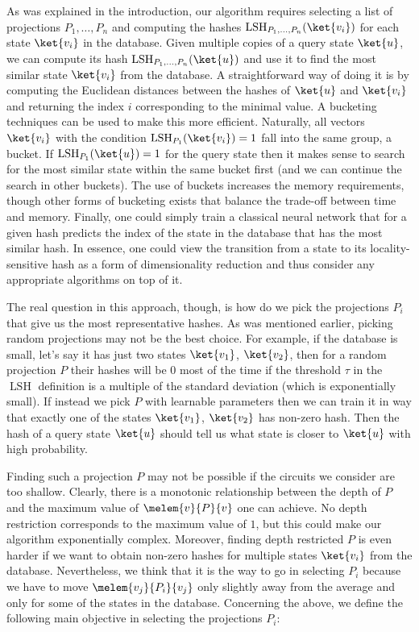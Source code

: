 \documentclass[pra,twocolumn,superscriptaddress,longbibliography]{revtex4-2}
\theoremstyle{remark}
\DeclareMathOperator{\lsh}{LSH}
\numberwithin{equation}{section}
\begin{document}
As was explained in the introduction, our algorithm requires selecting a list of projections $P_1, \dots, P_n$ and 
computing the hashes $\lsh_{P_1, \dots, P_n}(\ket{v_i})$ for each state $\ket{v_i}$ in the database. 
Given multiple copies of a query state $\ket{u}$, we can compute its hash $\lsh_{P_1, \dots, P_n}(\ket{u})$ and use it to 
find the most similar state $\ket{v_i}$ from the database. 
A straightforward way of doing it is by computing the Euclidean distances between the hashes of $\ket{u}$ and $\ket{v_i}$ 
and returning the index $i$ corresponding to the minimal value. A bucketing techniques can be used to make this more efficient. 
Naturally, all vectors $\ket{v_i}$ with the condition $\lsh_{P_1}(\ket{v_i})=1$ fall into the same group, a bucket. If 
$\lsh_{P_1}(\ket{u})=1$ for the query state then it makes sense to search for the most similar state within the same bucket first
(and we can continue the search in other buckets). The use of buckets increases the memory requirements, 
though other forms of bucketing exists that balance the trade-off between time and memory. 
Finally, one could simply train a classical neural network that for a given hash predicts the index of the state in the database that 
has the most similar hash. In essence, one could view the transition from a state to its locality-sensitive hash 
as a form of dimensionality reduction and thus consider any appropriate algorithms on top of it.

The real question in this approach, though, is how do we pick the projections $P_i$ that give us the most representative hashes. 
As was mentioned earlier, picking random projections may not be the best choice. For example, if the database is small, 
let's say it has just two states $\ket{v_1}$, $\ket{v_2}$, then for a random projection $P$ their hashes will be $0$ most of the time 
if the threshold $\tau$ in the $\lsh$ definition is a multiple of the standard deviation (which is exponentially small).
If instead we pick $P$ with learnable parameters then we can train it in way that exactly one of the states $\ket{v_1}$, $\ket{v_2}$ 
has non-zero hash. Then the hash of a query state $\ket{u}$ should tell us what state is closer to $\ket{u}$ with high probability. 

Finding such a projection $P$ may not be possible if the circuits we consider are too shallow.
Clearly, there is a monotonic relationship between the depth of $P$ and the maximum value of $\melem{v}{P}{v}$ one can achieve. 
No depth restriction corresponds to the maximum value of $1$, but this could make our algorithm exponentially complex. 
Moreover, finding depth restricted $P$ is even harder if we want to obtain non-zero hashes for multiple states $\ket{v_i}$ from the database. 
Nevertheless, we think that it is the way to go in selecting $P_i$ because we have to move $\melem{v_j}{P_i}{v_j}$ 
only slightly away from the average and only for some of the states in the database. 
Concerning the above, we define the following main objective in selecting the projections $P_i$:
\end{document}
